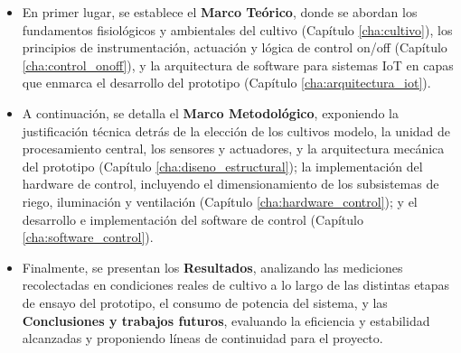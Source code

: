 \begin{itemize}
    \item En primer lugar, se establece el \textbf{Marco Teórico}, donde se abordan los fundamentos fisiológicos y ambientales del cultivo (Capítulo \ref{cha:cultivo}), los principios de instrumentación, actuación y lógica de control on/off (Capítulo \ref{cha:control_onoff}), y la arquitectura de software para sistemas IoT en capas que enmarca el desarrollo del prototipo (Capítulo \ref{cha:arquitectura_iot}).
    
    \item A continuación, se detalla el \textbf{Marco Metodológico}, exponiendo la justificación técnica detrás de la elección de los cultivos modelo, la unidad de procesamiento central, los sensores y actuadores, y la arquitectura mecánica del prototipo (Capítulo \ref{cha:diseno_estructural}); la implementación del hardware de control, incluyendo el dimensionamiento de los subsistemas de riego, iluminación y ventilación (Capítulo \ref{cha:hardware_control}); y el desarrollo e implementación del software de control (Capítulo \ref{cha:software_control}).
    
    \item Finalmente, se presentan los \textbf{Resultados}, analizando las mediciones recolectadas en condiciones reales de cultivo a lo largo de las distintas etapas de ensayo del prototipo, el consumo de potencia del sistema, y las \textbf{Conclusiones y trabajos futuros}, evaluando la eficiencia y estabilidad alcanzadas y proponiendo líneas de continuidad para el proyecto.
\end{itemize}